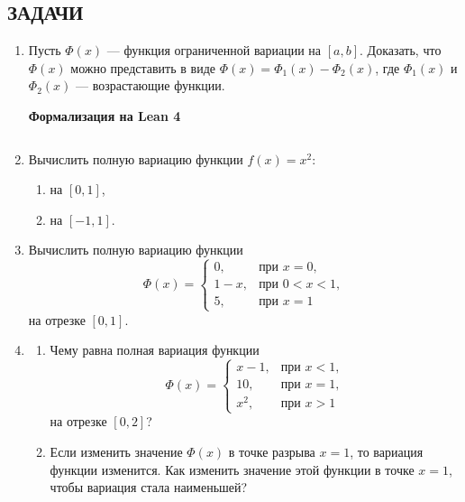 \documentclass[12pt,a4paper]{article}
\begin{document}
\subsection*{ЗАДАЧИ}
\begin{enumerate}
\newpage
\item Пусть $\Phi(x)$ — функция ограниченной вариации на $[a, b]$. Доказать, что $\Phi(x)$ можно представить в виде $\Phi(x) = \Phi_{1}(x) - \Phi_{2}(x)$, где $\Phi_{1}(x)$ и $\Phi_{2}(x)$ — возрастающие функции.


\begin{center}\small\textbf{Формализация на Lean 4}\end{center}
\inputminted{lean}{FunAn/Section05_BVandRS/Task01.lean}

\newpage

\item Вычислить полную вариацию функции $f(x) = x^{2}$:
\begin{enumerate}[label=\alph*)]
\item на $[0, 1]$,
\item на $[-1, 1]$.
\end{enumerate}

\item Вычислить полную вариацию функции
$$\Phi(x) =
\begin{cases} 0, & \text{при } x=0, \\ 1-x, & \text{при } 0<x<1, \\ 5, & \text{при } x=1
\end{cases}$$
на отрезке $[0, 1]$.

\item
\begin{enumerate}[label=\alph*)]
\item Чему равна полная вариация функции
$$\Phi(x) =
\begin{cases} x-1, & \text{при } x<1, \\ 10, & \text{при } x=1, \\ x^{2}, & \text{при } x>1
\end{cases}$$
на отрезке $[0, 2]$?
\item Если изменить значение $\Phi(x)$ в точке разрыва $x=1$, то вариация функции изменится. Как изменить значение этой функции в точке $x=1$, чтобы вариация стала наименьшей?
\end{enumerate}


\end{enumerate}
\end{document}
